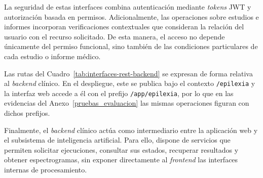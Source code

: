 La seguridad de estas interfaces combina
autenticación mediante \textit{tokens} JWT y autorización
basada en permisos. Adicionalmente, las operaciones
sobre estudios e informes incorporan verificaciones
contextuales que consideran la relación del usuario
con el recurso solicitado. De esta manera, el
acceso no depende únicamente del permiso funcional,
sino también de las condiciones particulares de
cada estudio o informe médico.

Las rutas del Cuadro~\ref{tab:interfaces-rest-backend} se expresan de forma relativa al \textit{backend} clínico.
En el despliegue, este se publica bajo el contexto \texttt{/epilexia} y la interfaz web accede a él con el prefijo \texttt{/app/epilexia}, por lo que en las evidencias del Anexo~\ref{pruebas_evaluacion} las mismas operaciones figuran con dichos prefijos.

Finalmente, el \textit{backend} clínico actúa como
intermediario entre la aplicación web y el
subsistema de inteligencia artificial. Para ello,
dispone de servicios que permiten solicitar
ejecuciones, consultar sus estados, recuperar
resultados y obtener espectrogramas, sin exponer
directamente al \textit{frontend} las interfaces internas
de procesamiento.


